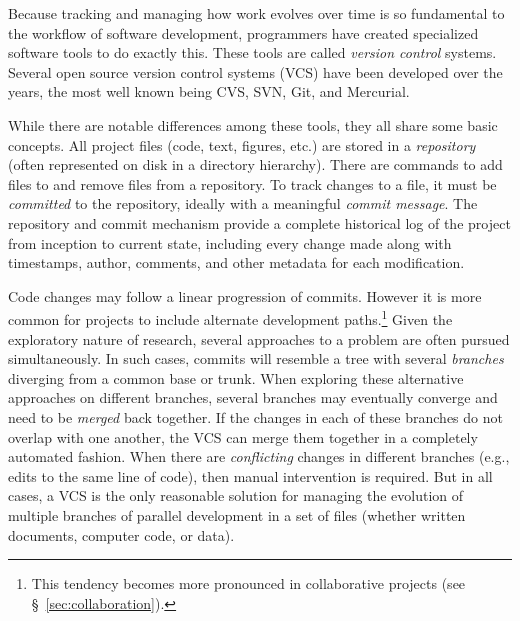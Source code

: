 \documentclass[11pt,oneside,english]{article}
\begin{document}
Because tracking and managing how work evolves over time is so fundamental to
the workflow of software development, programmers have created specialized
software tools to do exactly this. These tools are called \emph{version
  control} systems. Several open source version control systems (VCS) have been
developed over the years, the most well known being CVS, SVN, Git, and
Mercurial.

While there are notable differences among these tools, they all share some
basic concepts.  All project files (code, text, figures, etc.) are stored in a
\emph{repository} (often represented on disk in a directory hierarchy).  There
are commands to add files to and remove files from a repository.  To track
changes to a file, it must be \emph{committed} to the repository, ideally with
a meaningful \emph{commit message}.  The repository and commit mechanism
provide a complete historical log of the project from inception to current
state, including every change made along with timestamps, author, comments, and
other metadata for each modification.

Code changes may follow a linear progression of commits.  However it is more
common for projects to include alternate development paths.\footnote{This
tendency becomes more pronounced in collaborative projects (see
§~\ref{sec:collaboration}).} Given the exploratory nature of research, several
approaches to a problem are often pursued simultaneously. In such cases,
commits will resemble a tree with several \emph{branches} diverging from a
common base or trunk. When exploring these alternative approaches on different
branches, several branches may eventually converge and need to be \emph{merged}
back together.  If the changes in each of these branches do not overlap with
one another, the VCS can merge them together in a completely automated fashion.
When there are \emph{conflicting} changes in different branches (e.g., edits to
the same line of code), then manual intervention is required.  But in all
cases, a VCS is the only reasonable solution for managing the evolution of
multiple branches of parallel development in a set of files (whether written
documents, computer code, or data).
\end{document}
